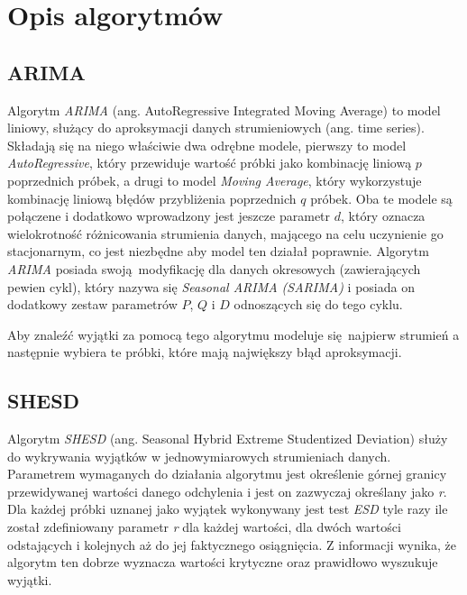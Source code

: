 \documentclass{classrep}
\begin{document}
    \section{Opis algorytmów} \label{algo_descripton} {

        \subsection{ARIMA} {
            Algorytm \textit{ARIMA}\cite{arima} (ang. AutoRegressive Integrated Moving Average) to
            model liniowy, służący do aproksymacji danych strumieniowych (ang. time series).
            Składają się na niego właściwie dwa odrębne modele, pierwszy to model
            \textit{AutoRegressive}, który przewiduje wartość próbki jako kombinację liniową $p$
            poprzednich próbek, a drugi to model \textit{Moving Average}, który wykorzystuje
            kombinację liniową błędów przybliżenia poprzednich $q$ próbek. Oba te modele są
            połączene i dodatkowo wprowadzony jest jeszcze parametr $d$, który oznacza wielokrotność
            różnicowania strumienia danych, mającego na celu uczynienie go stacjonarnym, co jest
            niezbędne aby model ten działał poprawnie. Algorytm \textit{ARIMA} posiada
            swoją modyfikację dla danych okresowych (zawierających pewien cykl), który nazywa się
            \textit{Seasonal ARIMA (SARIMA)} i posiada on dodatkowy zestaw parametrów $P$, $Q$ i $D$
            odnoszących się do tego cyklu.

            Aby znaleźć wyjątki za pomocą tego algorytmu modeluje się najpierw strumień a następnie
            wybiera te próbki, które mają największy błąd aproksymacji.
        }

        \subsection{SHESD} {
            Algorytm \textit{SHESD}\cite{shesd_wyklad} (ang. Seasonal Hybrid Extreme
            Studentized Deviation) służy do wykrywania wyjątków w jednowymiarowych
            strumieniach danych. Parametrem wymaganych do działania algorytmu jest
            określenie górnej granicy przewidywanej wartości danego odchylenia i jest
            on zazwyczaj określany jako \textit{r}. Dla każdej próbki uznanej jako wyjątek
            wykonywany jest test \textit{ESD} tyle razy ile został zdefiniowany
            parametr \textit{r} dla każdej wartości, dla dwóch wartości odstających i
            kolejnych aż do jej faktycznego osiągnięcia. Z informacji wynika, że
            algorytm ten dobrze wyznacza wartości krytyczne oraz prawidłowo wyszukuje
            wyjątki.
        }
    }
\end{document}
